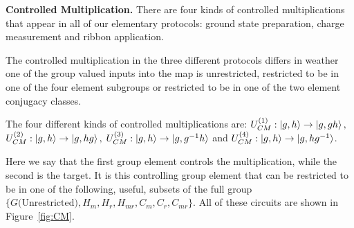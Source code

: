 \documentclass[two column]{article}
\begin{document}
\textbf{Controlled Multiplication.} There are four kinds of controlled multiplications that appear in all of our elementary protocols: ground state preparation, charge measurement and ribbon application.

The controlled multiplication in the three different protocols differs in weather one of the group valued inputs into the map is unrestricted, restricted to be in one of the four element subgroups or restricted to be in one of the two element conjugacy classes.

The four different kinds of controlled multiplications are:
$U_{CM}^{(1)}: \ket{g,h} \rightarrow \ket{g, gh},$
$U_{CM}^{(2)}: \ket{g,h} \rightarrow \ket{g, hg},$
$U_{CM}^{(3)}: \ket{g,h} \rightarrow \ket{g, g^{-1}h}$ and 
$U_{CM}^{(4)}: \ket{g,h} \rightarrow \ket{g, hg^{-1}}$.

Here we say that the first group element controls the multiplication, while the second is the target. It is this controlling group element that can be restricted to be in one of the following, useful, subsets of the full group $\{G\text{(Unrestricted)}, H_m, H_r, H_{mr}, C_m, C_r, C_{mr}\}$. All of these circuits are shown in Figure~\ref{fig:CM}.
\end{document}
